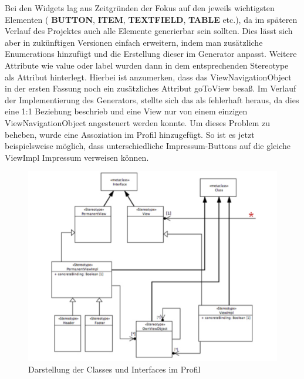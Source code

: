 Bei den Widgets lag aus Zeitgründen der Fokus auf den jeweils wichtigsten Elementen ( \textbf{BUTTON},  \textbf{ITEM},  \textbf{TEXTFIELD},  \textbf{TABLE} etc.), da im späteren Verlauf des Projektes auch alle Elemente generierbar sein sollten. Dies lässt sich aber in zukünftigen Versionen einfach erweitern, indem man zusätzliche Enumerations hinzufügt und die Erstellung dieser im Generator anpasst. 
Weitere Attribute wie value oder label wurden dann in dem entsprechenden Stereotype als Attribut hinterlegt.
Hierbei ist anzumerken, dass das ViewNavigationObject in der ersten Fassung noch ein zusätzliches Attribut goToView besaß. Im Verlauf der Implementierung des Generators, stellte sich das als fehlerhaft heraus, da dies eine 1:1 Beziehung beschrieb und eine View nur von einem einzigen ViewNavigationObject angesteuert werden konnte. Um dieses Problem zu beheben, wurde eine Assoziation im Profil hinzugefügt. So ist es jetzt beispielsweise möglich, dass unterschiedliche Impressum-Buttons auf die gleiche ViewImpl Impressum verweisen können. \\
\begin{figure}[htbp]
\begin{center}
\includegraphics[width=\textwidth]{./img/ProfilClass.pdf}
\caption{Darstellung der Classes und Interfaces im
Profil}\label{Fig:UMLProfilClass}
\end{center}
\end{figure}\\

